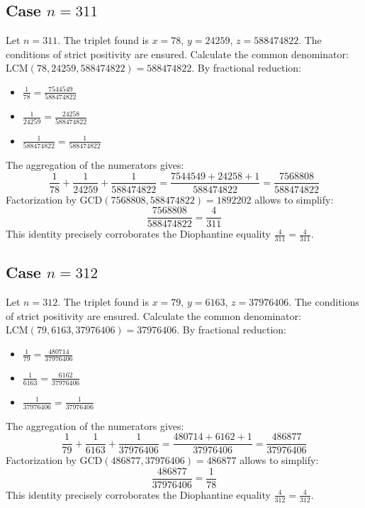 \documentclass[11pt,a4paper]{article}
\begin{document}
\subsection{Case $n = 311$}
Let $n = 311$. The triplet found is $x = 78$, $y = 24259$, $z = 588474822$.
The conditions of strict positivity are ensured.
Calculate the common denominator: $\text{LCM}(78, 24259, 588474822) = 588474822$.
By fractional reduction:
\begin{itemize}
    \item $\frac{1}{78} = \frac{7544549}{588474822}$
    \item $\frac{1}{24259} = \frac{24258}{588474822}$
    \item $\frac{1}{588474822} = \frac{1}{588474822}$
\end{itemize}
The aggregation of the numerators gives:
$$ \frac{1}{78} + \frac{1}{24259} + \frac{1}{588474822} = \frac{7544549 + 24258 + 1}{588474822} = \frac{7568808}{588474822} $$
Factorization by $\text{GCD}(7568808, 588474822) = 1892202$ allows to simplify:
$$ \frac{7568808}{588474822} = \frac{4}{311} $$
This identity precisely corroborates the Diophantine equality $\frac{4}{311} = \frac{4}{311}$.

\subsection{Case $n = 312$}
Let $n = 312$. The triplet found is $x = 79$, $y = 6163$, $z = 37976406$.
The conditions of strict positivity are ensured.
Calculate the common denominator: $\text{LCM}(79, 6163, 37976406) = 37976406$.
By fractional reduction:
\begin{itemize}
    \item $\frac{1}{79} = \frac{480714}{37976406}$
    \item $\frac{1}{6163} = \frac{6162}{37976406}$
    \item $\frac{1}{37976406} = \frac{1}{37976406}$
\end{itemize}
The aggregation of the numerators gives:
$$ \frac{1}{79} + \frac{1}{6163} + \frac{1}{37976406} = \frac{480714 + 6162 + 1}{37976406} = \frac{486877}{37976406} $$
Factorization by $\text{GCD}(486877, 37976406) = 486877$ allows to simplify:
$$ \frac{486877}{37976406} = \frac{1}{78} $$
This identity precisely corroborates the Diophantine equality $\frac{4}{312} = \frac{4}{312}$.
\end{document}

